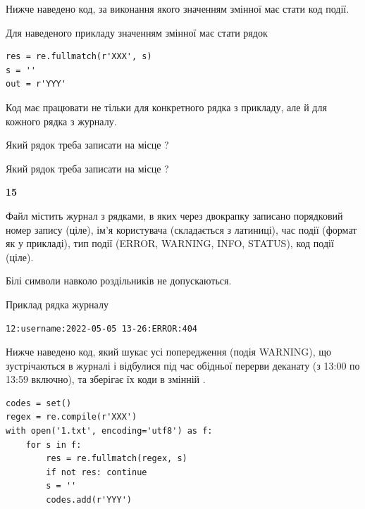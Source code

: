 Нижче наведено код, за виконання якого значенням змінної  має стати код події.

Для наведеного прикладу значенням змінної  має стати рядок 



\begin{verbatim}
res = re.fullmatch(r'XXX', s)
s = ''
out = r'YYY'
\end{verbatim}


Код має працювати не тільки для конкретного рядка з прикладу, але й для кожного рядка з журналу.




Який рядок треба записати на місце  ?\par
\vspace{5mm}


Який рядок треба записати на місце  ?\par


\newpage

{\begin {center}\textbf{ 15}\end {center}}\par
Файл  містить журнал з рядками, в яких через двокрапку записано поряд\-ко\-вий номер запису (ціле), ім'я користувача (складається з латиниці), час події (фор\-мат як у прикладі), тип події (ERROR, WARNING, INFO, STATUS), код події (ціле).

Білі символи навколо роздільників не допускаються.

Приклад рядка журналу



\begin{verbatim}
12:username:2022-05-05 13-26:ERROR:404
\end{verbatim}


Нижче наведено код, який шукає усі попередження (подія WARNING), що зустрі\-ча\-ються в журналі і відбулися під час обідньої перерви деканату (з 13:00 по 13:59 включно), та зберігає їх коди в змінній .



\begin{verbatim}
codes = set()
regex = re.compile(r'XXX')
with open('1.txt', encoding='utf8') as f:
    for s in f:
        res = re.fullmatch(regex, s)
        if not res: continue
        s = ''
        codes.add(r'YYY')
\end{verbatim}







